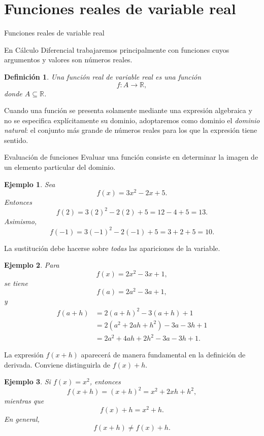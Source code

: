\documentclass[aspectratio=169,10pt]{beamer}
\newtheorem{definicion}{Definición}
\newtheorem{ejemplo}{Ejemplo}
\newcommand{\R}{\mathbb{R}}
\begin{document}
\section{Funciones reales de variable real}
\begin{frame}{Funciones reales de variable real}

En Cálculo Diferencial trabajaremos principalmente con funciones cuyos
argumentos y valores son números reales.

\begin{definicion}
Una función real de variable real es una función
\[
f:A\to\R,
\]
donde $A\subseteq\R$.
\end{definicion}

Cuando una función se presenta solamente mediante una expresión algebraica y
no se especifica explícitamente su dominio, adoptaremos como dominio el
\emph{dominio natural}: el conjunto más grande de números reales para los que
la expresión tiene sentido.

\end{frame}
\begin{frame}{Evaluación de funciones}
Evaluar una función consiste en determinar la imagen de un elemento particular
del dominio.

\begin{ejemplo}
Sea
\[
f(x)=3x^2-2x+5.
\]
Entonces
\[
f(2)=3(2)^2-2(2)+5=12-4+5=13.
\]
Asimismo,
\[
f(-1)=3(-1)^2-2(-1)+5=3+2+5=10.
\]

\end{ejemplo}

La sustitución debe hacerse sobre \emph{todas} las apariciones de la variable.

\begin{ejemplo}
Para
\[
f(x)=2x^2-3x+1,
\]
se tiene
\[
f(a)=2a^2-3a+1,
\]
y
\begin{align*}
f(a+h)
 &=2(a+h)^2-3(a+h)+1\\
 &=2(a^2+2ah+h^2)-3a-3h+1\\
 &=2a^2+4ah+2h^2-3a-3h+1.
\end{align*}
\end{ejemplo}

La expresión $f(x+h)$ aparecerá de manera fundamental en la definición de
derivada. Conviene distinguirla de $f(x)+h$.

\begin{ejemplo}
Si $f(x)=x^2$, entonces
\[
f(x+h)=(x+h)^2=x^2+2xh+h^2,
\]
mientras que
\[
f(x)+h=x^2+h.
\]
En general,
\[
f(x+h)\neq f(x)+h.
\]
\end{ejemplo}
\end{frame}
\end{document}
